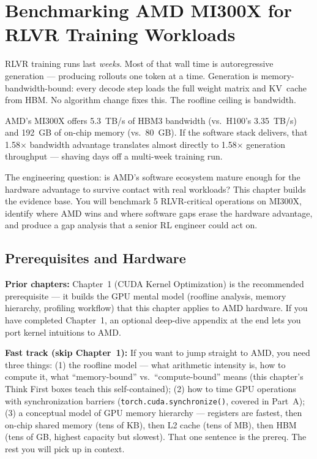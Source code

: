 \section{Benchmarking AMD MI300X for RLVR Training Workloads}

\smallskip

\begin{whythis}
RLVR training runs last \textit{weeks}. Most of that wall time is autoregressive generation --- producing rollouts one token at a time. Generation is memory-bandwidth-bound: every decode step loads the full weight matrix and KV~cache from HBM. No algorithm change fixes this. The roofline ceiling is bandwidth.

AMD's MI300X offers 5.3~TB/s of HBM3 bandwidth (vs.\ H100's 3.35~TB/s) and 192~GB of on-chip memory (vs.\ 80~GB). If the software stack delivers, that 1.58$\times$ bandwidth advantage translates almost directly to 1.58$\times$ generation throughput --- shaving days off a multi-week training run.

The engineering question: is AMD's software ecosystem mature enough for the hardware advantage to survive contact with real workloads? This chapter builds the evidence base. You will benchmark 5 RLVR-critical operations on MI300X, identify where AMD wins and where software gaps erase the hardware advantage, and produce a gap analysis that a senior RL engineer could act on.
\end{whythis}

\subsection{Prerequisites and Hardware}

\textbf{Prior chapters:} Chapter~1 (CUDA Kernel Optimization) is the recommended prerequisite --- it builds the GPU mental model (roofline analysis, memory hierarchy, profiling workflow) that this chapter applies to AMD hardware. If you have completed Chapter~1, an optional deep-dive appendix at the end lets you port kernel intuitions to AMD.

\textbf{Fast track (skip Chapter~1):} If you want to jump straight to AMD, you need three things: (1) the roofline model --- what arithmetic intensity is, how to compute it, what ``memory-bound'' vs.\ ``compute-bound'' means (this chapter's Think First boxes teach this self-contained); (2) how to time GPU operations with synchronization barriers (\texttt{torch.cuda.synchronize()}, covered in Part~A); (3) a conceptual model of GPU memory hierarchy --- registers are fastest, then on-chip shared memory (tens of KB), then L2 cache (tens of MB), then HBM (tens of GB, highest capacity but slowest). That one sentence is the prereq. The rest you will pick up in context.

